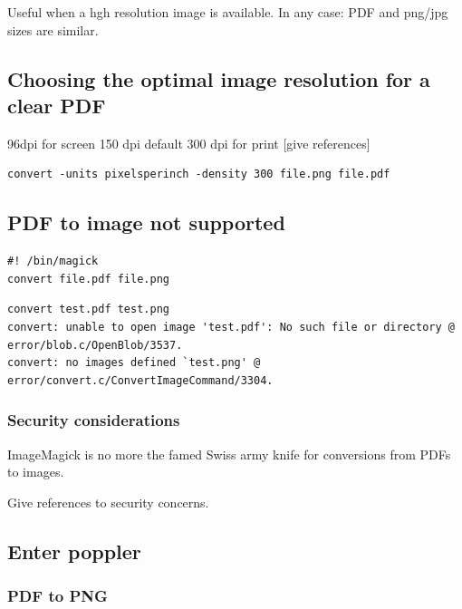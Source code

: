 \documentclass[
  11pt,
  british,
  a4paper,
]{article}
\begin{document}
Useful when a hgh resolution image is available. In any case: PDF and
png/jpg sizes are similar.

\hypertarget{choosing-the-optimal-image-resolution-for-a-clear-pdf}{%
\subsection{Choosing the optimal image resolution for a clear
PDF}\label{choosing-the-optimal-image-resolution-for-a-clear-pdf}}

96dpi for screen 150 dpi default 300 dpi for print {[}give references{]}

\begin{verbatim}
convert -units pixelsperinch -density 300 file.png file.pdf
\end{verbatim}

\hypertarget{pdf-to-image-not-supported}{%
\subsection{PDF to image not
supported}\label{pdf-to-image-not-supported}}

\begin{verbatim}
#! /bin/magick
convert file.pdf file.png
\end{verbatim}

\begin{verbatim}
convert test.pdf test.png
convert: unable to open image 'test.pdf': No such file or directory @ error/blob.c/OpenBlob/3537.
convert: no images defined `test.png' @ error/convert.c/ConvertImageCommand/3304.
\end{verbatim}

\hypertarget{security-considerations}{%
\subsubsection{Security considerations}\label{security-considerations}}

ImageMagick is no more the famed Swiss army knife for conversions from
PDFs to images.

Give references to security concerns.

\hypertarget{enter-poppler}{%
\subsection{Enter poppler}\label{enter-poppler}}

\hypertarget{pdf-to-png}{%
\subsubsection{PDF to PNG}\label{pdf-to-png}}
\end{document}

